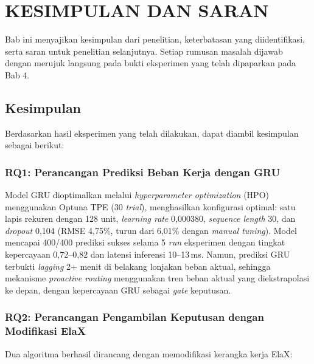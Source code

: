 
\chapter{KESIMPULAN DAN SARAN}
\label{sec:kesimpulan-dan-saran}

Bab ini menyajikan kesimpulan dari penelitian, keterbatasan yang diidentifikasi, serta saran untuk penelitian selanjutnya. Setiap rumusan masalah dijawab dengan merujuk langsung pada bukti eksperimen yang telah dipaparkan pada Bab 4.

\section{Kesimpulan}
\label{sec:kesimpulan}

Berdasarkan hasil eksperimen yang telah dilakukan, dapat diambil kesimpulan sebagai berikut:

\subsection{RQ1: Perancangan Prediksi Beban Kerja dengan GRU}

Model GRU dioptimalkan melalui \emph{hyperparameter optimization} (HPO) menggunakan Optuna TPE (30 \emph{trial}), menghasilkan konfigurasi optimal: satu lapis rekuren dengan 128 unit, \emph{learning rate} 0,000380, \emph{sequence length} 30, dan \emph{dropout} 0,104 (RMSE 4,75\%, turun dari 6,01\% dengan \emph{manual tuning}). Model mencapai 400/400 prediksi sukses selama 5 \emph{run} eksperimen dengan tingkat kepercayaan 0,72--0,82 dan latensi inferensi 10--13\,ms. Namun, prediksi GRU terbukti \emph{lagging} 2+ menit di belakang lonjakan beban aktual, sehingga mekanisme \emph{proactive routing} menggunakan tren beban aktual yang diekstrapolasi ke depan, dengan kepercayaan GRU sebagai \emph{gate} keputusan.

\subsection{RQ2: Perancangan Pengambilan Keputusan dengan Modifikasi ElaX}

Dua algoritma berhasil dirancang dengan memodifikasi kerangka kerja ElaX:

